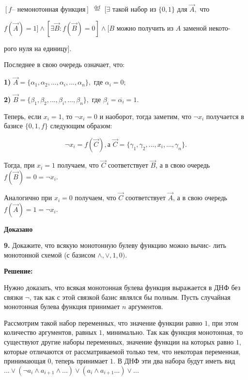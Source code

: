 \documentclass[a4paper,12pt]{article} %
\begin{document}
$[f \text{-- немонотонная функция} ]$ $\overset{\mathrm{def}}{=}$ $[\exists \text{ такой набор из } \{0,1\} \text{ для } \vec{A}, \text{ что }$

$f(\vec{A}) = 1] \wedge [\exists \vec{B} : f(\vec{B}) = 0]\wedge [B \text{ можно получить из } A \text{ заменой некото-}$

$\text{рого нуля на единицу}]$.

Последнее в свою очередь означает, что:

{\bf 1)} $\vec{A} = \{\alpha_1, \alpha_2, ... , \alpha_i,..., \alpha_n\},$ где $\alpha_i = 0$;

{\bf 2)} $\vec{B} = \{\beta_1, \beta_2, ... , \beta_i,..., \beta_n \},$ где $\beta_i = \overline{\alpha_i} = 1$.

Теперь, если $x_i = 1$, то $\neg x_i = 0$ и наоборот, тогда заметим, что $\neg x_i$ получается в базисе $\{0,1,f\}$ следующим образом:

\[\neg x_i = f(\vec{C}), \text{а } \vec{C} = \{\gamma_1,\gamma_2, ... , x_i, ... , \gamma_n\}.\]

Тогда, при $x_i = 1$ получаем, что $\vec{C}$ соответствует $\vec{B}$, а  в свою очередь $f(\vec{B}) = 0 = \neg x_i$.

Аналогично при $x_i = 0$ получаем, что  $\vec{C}$ соответствует $\vec{A}$, а  в свою очередь $f(\vec{A}) = 1 = \neg x_i$.


\begin{flushright}
\begin{large}
\textbf {Доказано}
\end{large}
\end{flushright}

{\bf 9.} Докажите, что всякую монотонную булеву функцию можно вычис-
лить монотонной схемой (с базисом $\wedge, \vee, 1, 0)$.
\begin{center}
\bfseries
{\Large Решение: }
\end{center}

Нужно доказать, что всякая монотонная булева функция выражается в ДНФ без связки $\neg$, так как с этой связкой базис являлся бы полным. Пусть случайная монотонная булева функция принимает $n$ аргументов.

Рассмотрим такой набор переменных, что значение функции  равно $1$, при этом количество аргументов, равных $1$, минимально. Так как функция монотонная, то существуют
другие наборы переменных, значение функции на которых равно $1$, которые отличаются от рассматриваемой только тем, что некоторая переменная, принимающая $0$, теперь принимает $1$. В ДНФ эти два набора будут иметь вид $... \vee (\neg a_i \wedge a_{i+1} \wedge...) \vee (a_i \wedge a_{i+1}...) \vee ...$
\end{document}
